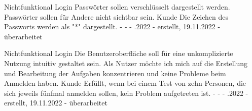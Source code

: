 \begin{myreq}
  \twoinline
    {}
    {\reqtype Nichtfunktional}
    {\reqevent Login}
  \reqdesc Passwörter sollen verschlüsselt dargestellt werden.
  \reqrat Passwörter sollen für Andere nicht sichtbar sein.
  \reqorig Kunde
  \reqfit Die Zeichen des Passworts werden als "*" dargestellt.
  \twoinline
    {}
    {}
  \twoinline
  {\reqdep -}
  {\reqconf -}
  \reqmater -
  .2022 - erstellt, 19.11.2022 - überarbeitet
\end{myreq}

\begin{myreq}
  \twoinline
    {}
    {\reqtype Nichtfunktional}
    {\reqevent Login}
  \reqdesc Die Benutzeroberfläche soll für eine unkomplizierte Nutzung intuitiv gestaltet sein.
  \reqrat Als Nutzer möchte ich mich auf die Erstellung und Bearbeitung der Aufgaben konzentrieren und keine Probleme beim Anmelden haben.
  \reqorig Kunde 
  \reqfit Erfüllt, wenn bei einem Test von zehn Personen, die sich jeweils fünfmal anmelden sollen, kein Problem aufgetreten ist.
  \twoinline
    {}
    {}
  \twoinline
  {\reqdep -}
  {\reqconf -}
  \reqmater -
  .2022 - erstellt, 19.11.2022 - überarbeitet
\end{myreq}